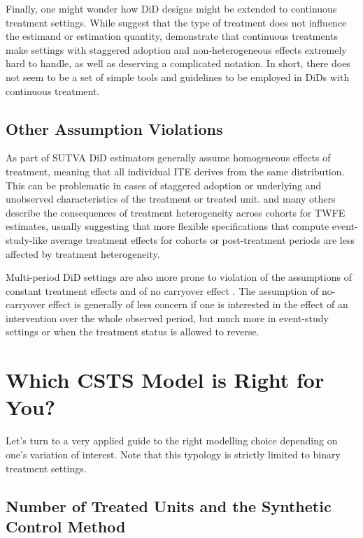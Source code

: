 \documentclass[hidelinks]{article}\usepackage[]{graphicx}\usepackage[]{xcolor}
\begin{document}
Finally, one might wonder how DiD designs might be extended to continuous treatment settings. While \textcite{Angrist2009} suggest that the type of treatment does not influence the estimand or estimation quantity, \textcite{Callaway2021} demonstrate that continuous treatments make settings with staggered adoption and non-heterogeneous effects extremely hard to handle, as well as deserving a complicated notation. In short, there does not seem to be a set of simple tools and guidelines to be employed in DiDs with continuous treatment.


\subsection{Other Assumption Violations}


As part of SUTVA DiD estimators generally assume homogeneous effects of treatment, meaning that all individual ITE derives from the same distribution. This can be problematic in cases of staggered adoption or underlying and unobserved characteristics of the treatment or treated unit. \textcite{GoodmanBacon2021} and many others describe the consequences of treatment heterogeneity across cohorts for TWFE estimates, usually suggesting that more flexible specifications that compute event-study-like average treatment effects for cohorts or post-treatment periods are less affected by treatment heterogeneity.

Multi-period DiD settings are also more prone to violation of the assumptions of constant treatment effects and of no carryover effect \parencite[i.e. past treatments affect current outcomes][]{Liu}. The assumption of no-carryover effect is generally of less concern if one is interested in the effect of an intervention over the whole observed period, but much more in event-study settings or when the treatment status is allowed to reverse.


\section{Which CSTS Model is Right for You?}

Let's turn to a very applied guide to the right modelling choice depending on one's variation of interest. Note that this typology is strictly limited to binary treatment settings.

\subsection{Number of Treated Units and the Synthetic Control Method}
\end{document}
